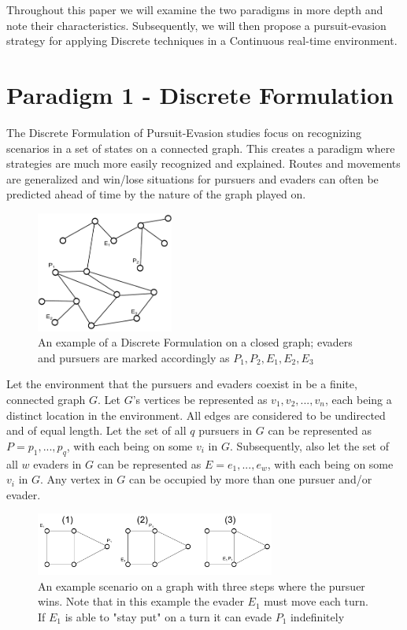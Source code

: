 \documentclass{article}
\begin{document}
Throughout this paper we will examine the two paradigms in more depth and note their characteristics. Subsequently, we will then propose a pursuit-evasion strategy for applying Discrete techniques in a Continuous real-time environment.

\section{Paradigm 1 - Discrete Formulation}
The Discrete Formulation of Pursuit-Evasion studies focus on recognizing scenarios in a set of states on a connected graph. This creates a paradigm where strategies are much more easily recognized and explained. Routes and movements are generalized and win/lose situations for pursuers and evaders can often be predicted ahead of time by the nature of the graph played on.

\begin{figure}[htb]
\centering
\includegraphics[width=0.4\textwidth]{"graph1"}
\caption{An example of a Discrete Formulation on a closed graph; evaders and pursuers are marked accordingly as \(P_1,P_2,E_1,E_2,E_3\)}
\end{figure}

Let the environment that the pursuers and evaders coexist in be a finite, connected graph \(G\). Let \(G\)'s vertices be represented as \(v_1,v_2,...,v_n\), each being a distinct location in the environment. All edges are considered to be undirected and of equal length. Let the set of all \(q\) pursuers in \(G\) can be represented as \(P = {p_1,...,p_q}\), with each being on some \(v_i\) in \(G\). Subsequently, also let the set of all \(w\) evaders in \(G\) can be represented as \(E = {e_1,...,e_w}\), with each being on some \(v_i\) in \(G\). Any vertex in \(G\) can be occupied by more than one pursuer and/or evader.

\begin{figure}[htb]
\centering
\includegraphics[width=0.7\textwidth]{"graph2_steps"}
\caption{An example scenario on a graph with three steps where the pursuer wins. Note that in this example the evader \(E_1\) must move each turn. If \(E_1\) is able to "stay put" on a turn it can evade \(P_1\) indefinitely}
\end{figure}
\end{document}
